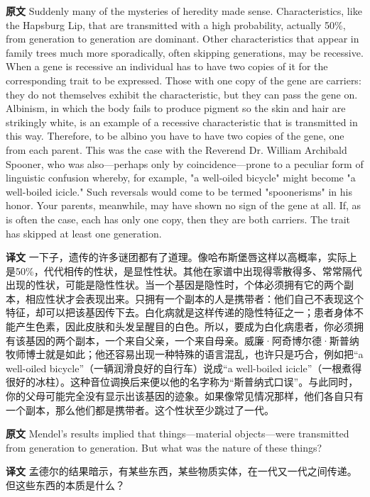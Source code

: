 \documentclass[UTF8,zihao=-4]{ctexart}
\newcommand{\BodyFont}{\fontsize{10.5pt}{15.5pt}\selectfont}
\renewenvironment{quote}{\par\noindent\begingroup\BodyFont}{\par\endgroup}
\begin{document}
\begin{quote}
\noindent\textbf{原文} Suddenly many of the mysteries of heredity made sense. Characteristics, like the Hapsburg Lip, that are transmitted with a high probability, actually 50\%, from generation to generation are dominant. Other characteristics that appear in family trees much more sporadically, often skipping generations, may be recessive. When a gene is recessive an individual has to have two copies of it for the corresponding trait to be expressed. Those with one copy of the gene are carriers: they do not themselves exhibit the characteristic, but they can pass the gene on. Albinism, in which the body fails to produce pigment so the skin and hair are strikingly white, is an example of a recessive characteristic that is transmitted in this way. Therefore, to be albino you have to have two copies of the gene, one from each parent. This was the case with the Reverend Dr. William Archibald Spooner, who was also---perhaps only by coincidence---prone to a peculiar form of linguistic confusion whereby, for example, "a well-oiled bicycle" might become "a well-boiled icicle." Such reversals would come to be termed "spoonerisms" in his honor. Your parents, meanwhile, may have shown no sign of the gene at all. If, as is often the case, each has only one copy, then they are both carriers. The trait has skipped at least one generation.

\smallskip
\noindent\textbf{译文} 一下子，遗传的许多谜团都有了道理。像哈布斯堡唇这样以高概率，实际上是50\%，代代相传的性状，是显性性状。其他在家谱中出现得零散得多、常常隔代出现的性状，可能是隐性性状。当一个基因是隐性时，个体必须拥有它的两个副本，相应性状才会表现出来。只拥有一个副本的人是携带者：他们自己不表现这个特征，却可以把该基因传下去。白化病就是这样传递的隐性特征之一；患者身体不能产生色素，因此皮肤和头发呈醒目的白色。所以，要成为白化病患者，你必须拥有该基因的两个副本，一个来自父亲，一个来自母亲。威廉·阿奇博尔德·斯普纳牧师博士就是如此；他还容易出现一种特殊的语言混乱，也许只是巧合，例如把“a well-oiled bicycle”（一辆润滑良好的自行车）说成“a well-boiled icicle”（一根煮得很好的冰柱）。这种音位调换后来便以他的名字称为“斯普纳式口误”。与此同时，你的父母可能完全没有显示出该基因的迹象。如果像常见情况那样，他们各自只有一个副本，那么他们都是携带者。这个性状至少跳过了一代。
\end{quote}

\begin{quote}
\noindent\textbf{原文} Mendel's results implied that things---material objects---were transmitted from generation to generation. But what was the nature of these things?

\smallskip
\noindent\textbf{译文} 孟德尔的结果暗示，有某些东西，某些物质实体，在一代又一代之间传递。但这些东西的本质是什么？
\end{quote}
\end{document}
